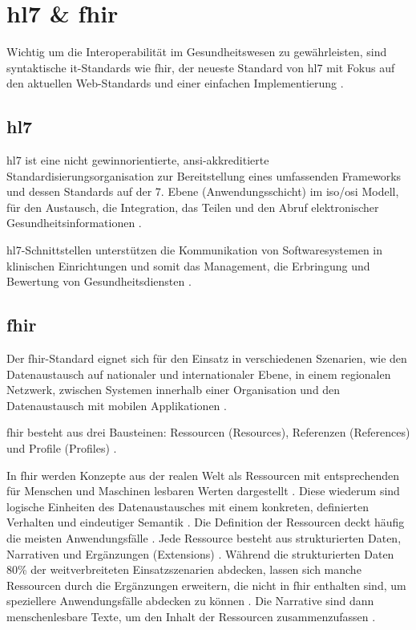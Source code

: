 \section{\acs{hl7} \& \acs{fhir}} \label{sec:hl7fhir}

Wichtig um die Interoperabilität im Gesundheitswesen zu gewährleisten, sind syntaktische \ac{it}-Standards wie \ac{fhir}, der neueste Standard von \ac{hl7} mit Fokus auf den aktuellen Web-Standards und einer einfachen Implementierung \cite{telemedizin, hl7, fhir}.

\subsection{\acs{hl7}} \label{subsec:hl7}

\acf{hl7} ist eine nicht gewinnorientierte, \ac{ansi}-akkreditierte Standardisierungsorganisation zur Bereitstellung eines umfassenden Frameworks und dessen Standards auf der 7. Ebene (Anwendungsschicht) im \ac{iso}/\ac{osi} Modell, für den Austausch, die Integration, das Teilen und den Abruf elektronischer Gesundheitsinformationen \cite{telemedizin, ehealtOk, hl7}. 

\ac{hl7}-Schnittstellen unterstützen die Kommunikation von Softwaresystemen in klinischen Einrichtungen und somit das Management, die Erbringung und Bewertung von Gesundheitsdiensten \cite{ehealtOk, hl7, fhir}.

\subsection{\acs{fhir}} \label{subsec:fhir}

Der \acf{fhir}-Standard eignet sich für den Einsatz in verschiedenen Szenarien, wie den Datenaustausch auf nationaler und internationaler Ebene, in einem regionalen Netzwerk, zwischen Systemen innerhalb einer Organisation und den Datenaustausch mit mobilen Applikationen \cite{ehealtOk, fhir}. 

\ac{fhir} besteht aus drei Bausteinen: Ressourcen (Resources), Referenzen (References) und Profile (Profiles) \cite{fhir}.

In \ac{fhir} werden Konzepte aus der realen Welt als Ressourcen mit entsprechenden für Menschen und Maschinen lesbaren Werten dargestellt \cite{ehealtOk}. Diese wiederum sind logische Einheiten des Datenaustausches mit einem konkreten, definierten Verhalten und eindeutiger Semantik \cite{fhir}. Die Definition der Ressourcen deckt häufig die meisten Anwendungsfälle \cite{ehealtOk}. Jede Ressource besteht aus strukturierten Daten, Narrativen und Ergänzungen (Extensions) \cite{fhir}. Während die strukturierten Daten 80\% der weitverbreiteten Einsatzszenarien abdecken, lassen sich manche Ressourcen durch die Ergänzungen erweitern, die nicht in \ac{fhir} enthalten sind, um speziellere Anwendungsfälle abdecken zu können \cite{fhir, ehealtOk}. Die Narrative sind dann menschenlesbare Texte, um den Inhalt der Ressourcen zusammenzufassen \cite{fhir}.

